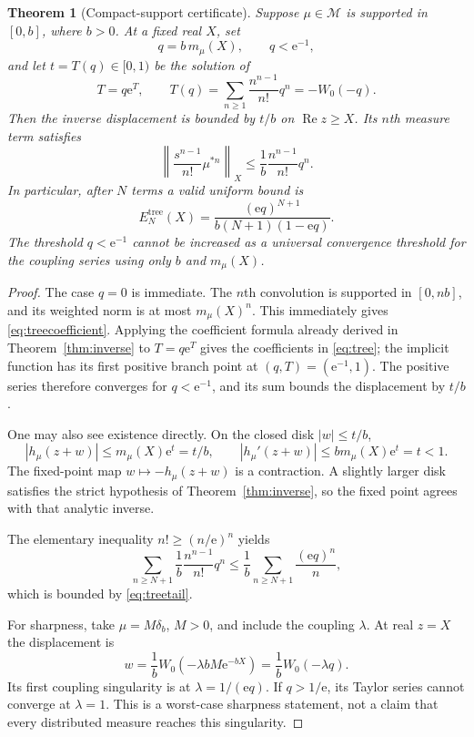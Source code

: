 \documentclass[11pt,a4paper]{article}
\newtheorem{theorem}{Theorem}[section]
\theoremstyle{definition}
\theoremstyle{remark}
\newcommand{\e}{\mathrm e}
\newcommand{\Rea}{\operatorname{Re}}
\numberwithin{equation}{section}
\begin{document}
\begin{theorem}[Compact-support certificate]\label{thm:tree}
Suppose $\mu\in\mathcal M$ is supported in $[0,b]$, where $b>0$. At a fixed real $X$, set
\[
 q=b\,m_\mu(X),\qquad q<\e^{-1},
\]
and let $t=T(q)\in[0,1)$ be the solution of
\begin{equation}\label{eq:tree}
 T=q\e^T,\qquad
 T(q)=\sum_{n\ge1}\frac{n^{n-1}}{n!}q^n=-W_0(-q).
\end{equation}
Then the inverse displacement is bounded by $t/b$ on $\Rea z\ge X$. Its $n$th measure term satisfies
\begin{equation}\label{eq:treecoefficient}
 \left\|\frac{s^{n-1}}{n!}\mu^{*n}\right\|_X
 \le\frac1b\frac{n^{n-1}}{n!}q^n.
\end{equation}
In particular, after $N$ terms a valid uniform bound is
\begin{equation}\label{eq:treetail}
 E_N^{\mathrm{tree}}(X)=
 \frac{(\e q)^{N+1}}{b(N+1)(1-\e q)}.
\end{equation}
The threshold $q<\e^{-1}$ cannot be increased as a universal convergence threshold for the coupling series using only $b$ and $m_\mu(X)$.
\end{theorem}
\begin{proof}
The case $q=0$ is immediate. The $n$th convolution is supported in $[0,nb]$, and its weighted norm is at most $m_\mu(X)^n$. This immediately gives \eqref{eq:treecoefficient}. Applying the coefficient formula already derived in Theorem~\ref{thm:inverse} to $T=q\e^T$ gives the coefficients in \eqref{eq:tree}; the implicit function has its first positive branch point at $(q,T)=(\e^{-1},1)$. The positive series therefore converges for $q<\e^{-1}$, and its sum bounds the displacement by $t/b$.

One may also see existence directly. On the closed disk $|w|\le t/b$,
\[
 |h_\mu(z+w)|\le m_\mu(X)\e^t=t/b,
 \qquad
 |h_\mu'(z+w)|\le b m_\mu(X)\e^t=t<1.
\]
The fixed-point map $w\mapsto-h_\mu(z+w)$ is a contraction. A slightly larger disk satisfies the strict hypothesis of Theorem~\ref{thm:inverse}, so the fixed point agrees with that analytic inverse.

The elementary inequality $n!\ge(n/\e)^n$ yields
\[
 \sum_{n\ge N+1}\frac1b\frac{n^{n-1}}{n!}q^n
 \le \frac1b\sum_{n\ge N+1}\frac{(\e q)^n}{n},
\]
which is bounded by \eqref{eq:treetail}.

For sharpness, take $\mu=M\delta_b$, $M>0$, and include the coupling $\lambda$. At real $z=X$ the displacement is
\[
 w=\frac1bW_0(-\lambda bM\e^{-bX})=\frac1bW_0(-\lambda q).
\]
Its first coupling singularity is at $\lambda=1/(\e q)$. If $q>1/\e$, its Taylor series cannot converge at $\lambda=1$. This is a worst-case sharpness statement, not a claim that every distributed measure reaches this singularity.
\end{proof}
\end{document}
